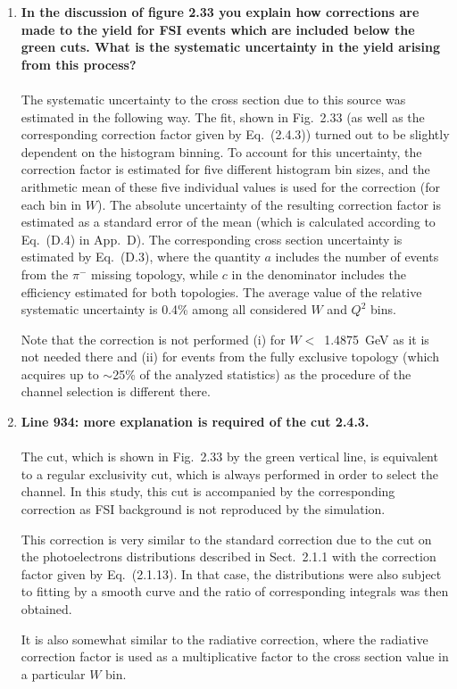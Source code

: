 \documentclass[,superscriptaddress,showpacs,amssymb,amsmath,amsfonts,linenumbers,article]{revtex4-1}
\begin{document}
\begin{enumerate}[label=\textbf{\arabic*}.]
\item {\bf In the discussion of figure 2.33 you explain how corrections are made to the yield for FSI events which are included below the green cuts. What is the systematic uncertainty in the yield arising from this process?}\\ \\
The systematic uncertainty to the cross section due to this source was estimated in the following way. The fit, shown in Fig.~2.33 (as well as the corresponding correction factor given by Eq.~(2.4.3)) turned out to be slightly dependent on the histogram binning. To account for this uncertainty, the correction factor is estimated for five different histogram bin sizes, and the arithmetic mean of these five individual values is used for the correction (for each bin in $W$). The absolute uncertainty of the resulting correction factor is estimated as a standard error of the mean (which is calculated according to Eq.~(D.4) in App.~D). The corresponding cross section uncertainty is estimated by Eq.~(D.3), where the quantity $a$ includes the number of events from the $\pi^{-}$ missing topology, while $c$ in the denominator includes the efficiency estimated for both topologies. The average value of the relative systematic uncertainty is 0.4\% among all considered $W$ and $Q^{2}$ bins.

Note that the correction is not performed (i) for $W<$~1.4875~GeV as it is not needed there and (ii) for events from the fully exclusive topology (which acquires up to $\sim$25\% of the analyzed statistics) as the procedure of the channel selection is different there. 

\item {\bf Line 934: more explanation is required of the cut 2.4.3.}\\ \\
The cut, which is shown in Fig.~2.33 by the green vertical line, is equivalent to a regular exclusivity cut, which is always performed in order to select the channel. In this study, this cut is accompanied by the corresponding correction as FSI background is not reproduced by the simulation.


This correction is very similar to the standard correction due to the cut on the photoelectrons distributions described in Sect.~2.1.1 with the correction factor given by Eq.~(2.1.13). In that case, the distributions were also subject to fitting by a smooth curve and the ratio of corresponding integrals was then obtained. 

It is also somewhat similar to the radiative correction, where the radiative correction factor is used as a multiplicative factor to the cross section value in a particular $W$ bin. 


\end{enumerate}
\end{document}
